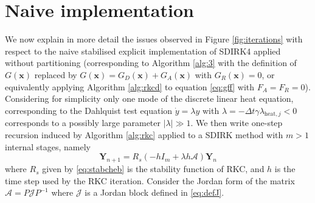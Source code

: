 \documentclass[10pt,a4paper]{article}
\def \calJ{\mathcal{J}}
\newcommand{\norm}[1]{\left\lVert #1 \right\rVert}
\begin{document}
\section{Naive implementation}
\label{appendix:naive}
We now explain in more detail the issues observed in Figure \ref{fig:iterations} with respect to the naive stabilised explicit implementation of SDIRK4 applied without partitioning {(corresponding to Algorithm \ref{alg:3} with 
the definition of $G(\boldsymbol{x})$ replaced by $G(\boldsymbol{x})=G_D(\boldsymbol{x})+G_A(\boldsymbol{x})$ with $G_R(\boldsymbol{x})=0$, or equivalently applying Algorithm \ref{alg:rkcd} to equation \eqref{eq:gff} with $F_A=F_R=0$)}. 
Considering for simplicity only one mode of the discrete linear heat equation, corresponding to the Dahlquist test equation $\dot y =\lambda y$ 
with $\lambda=-\Delta t \gamma \lambda_{\text{heat},j}<0$ corresponds to a possibly large parameter $|\lambda|\gg 1$.
We then write one-step recursion induced by Algorithm \ref{alg:rkc} applied to a SDIRK method with $m>1$ internal stages, namely  %
\[
\mathbf{Y}_{n+1}=R_{s}(-hI_m+ \lambda h\mathcal{A})\mathbf{Y}_{n}
\]
where $R_{s}$  given by \eqref{eq:stabcheb} is the stability function of RKC, and $h$ is the time step used by the RKC iteration. 
Consider the Jordan form of the matrix $\mathcal{A}=P\mathcal{J}P^{-1}$ where
$\mathcal{J}$ is a Jordan block defined in \eqref{eq:defJ}.
\end{document}
